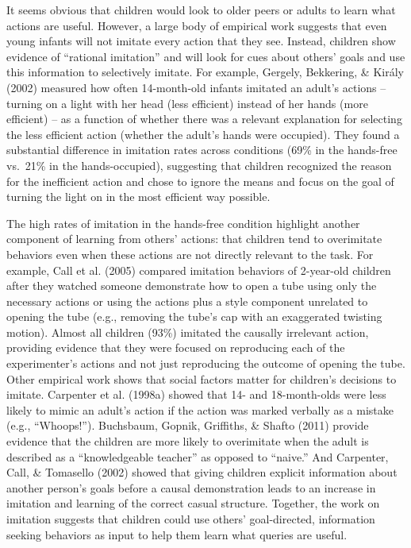 \documentclass[oneside]{report}
\begin{document}
It seems obvious that children would look to older peers or adults to
learn what actions are useful. However, a large body of empirical work
suggests that even young infants will not imitate every action that they
see. Instead, children show evidence of ``rational imitation'' and will
look for cues about others' goals and use this information to
selectively imitate. For example, Gergely, Bekkering, \& Király (2002)
measured how often 14-month-old infants imitated an adult's actions --
turning on a light with her head (less efficient) instead of her hands
(more efficient) -- as a function of whether there was a relevant
explanation for selecting the less efficient action (whether the adult's
hands were occupied). They found a substantial difference in imitation
rates across conditions (69\% in the hands-free vs.~21\% in the
hands-occupied), suggesting that children recognized the reason for the
inefficient action and chose to ignore the means and focus on the goal
of turning the light on in the most efficient way possible.

The high rates of imitation in the hands-free condition highlight
another component of learning from others' actions: that children tend
to overimitate behaviors even when these actions are not directly
relevant to the task. For example, Call et al. (2005) compared imitation
behaviors of 2-year-old children after they watched someone demonstrate
how to open a tube using only the necessary actions or using the actions
plus a style component unrelated to opening the tube (e.g., removing the
tube's cap with an exaggerated twisting motion). Almost all children
(93\%) imitated the causally irrelevant action, providing evidence that
they were focused on reproducing each of the experimenter's actions and
not just reproducing the outcome of opening the tube. Other empirical
work shows that social factors matter for children's decisions to
imitate. Carpenter et al. (1998a) showed that 14- and 18-month-olds were
less likely to mimic an adult's action if the action was marked verbally
as a mistake (e.g., ``Whoops!''). Buchsbaum, Gopnik, Griffiths, \&
Shafto (2011) provide evidence that the children are more likely to
overimitate when the adult is described as a ``knowledgeable teacher''
as opposed to ``naive.'' And Carpenter, Call, \& Tomasello (2002) showed
that giving children explicit information about another person's goals
before a causal demonstration leads to an increase in imitation and
learning of the correct casual structure. Together, the work on
imitation suggests that children could use others' goal-directed,
information seeking behaviors as input to help them learn what queries
are useful.
\end{document}
